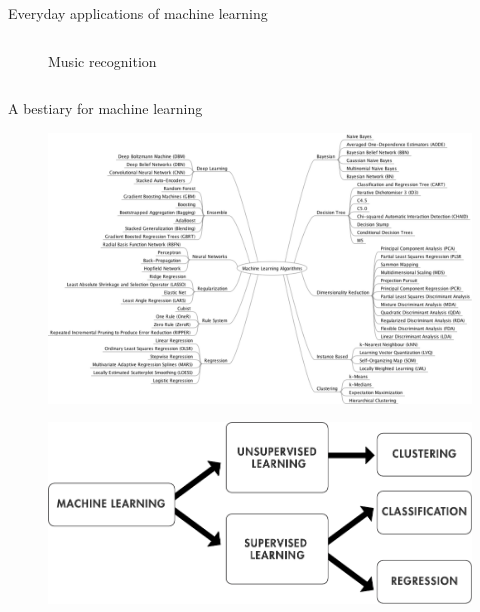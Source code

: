 \documentclass[aspectratio=169]{beamer}
\begin{document}
\begin{frame}{Everyday applications of machine learning}
\begin{columns}
{\begin{figure}
            \caption{\scriptsize Music recognition}
          \end{figure}
        }
    \end{columns}
  \end{frame}

  \begin{frame}{A bestiary for machine learning}
    \begin{figure}
      \includegraphics[width=0.75\linewidth]{Figures/Zoo}
    \end{figure}
  \end{frame}

  \begin{frame}{}
    \begin{figure}
      \includegraphics[width=0.75\linewidth]{Figures/Machine_learning_pipeline}
    \end{figure}
  \end{frame}
\end{document}
